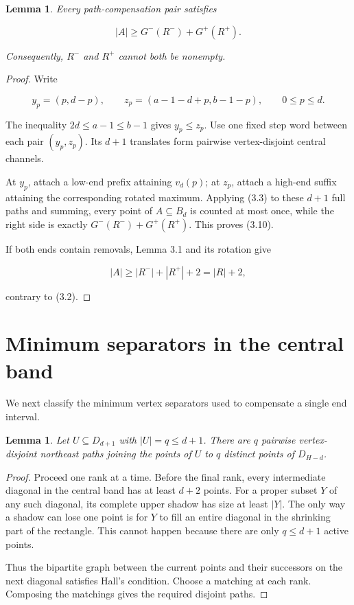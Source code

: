 \documentclass[11pt]{article}
\newtheorem{lemma}[theorem]{Lemma}
\numberwithin{equation}{section}
\begin{document}
\Needspace{0.25\textheight}
\begin{lemma}

Every path-compensation pair satisfies

\nopagebreak[4]
\[
|A|\ge G^-(R^-)+G^+(R^+).
\tag{3.10}
\]

Consequently, $R^-$ and $R^+$ cannot both be nonempty.

\end{lemma}

\begin{proof}

Write

\nopagebreak[4]
\[
y_p=(p,d-p),\qquad
z_p=(a-1-d+p,b-1-p),
\qquad 0\le p\le d.
\]

The inequality $2d\le a-1\le b-1$ gives $y_p\le z_p$. Use one fixed step
word between each pair $(y_p,z_p)$. Its $d+1$ translates form pairwise
vertex-disjoint central channels.

At $y_p$, attach a low-end prefix attaining $v_d(p)$; at $z_p$, attach a
high-end suffix attaining the corresponding rotated maximum. Applying
(3.3) to these $d+1$ full paths and summing, every point of $A\subseteq B_d$
is counted at most once, while the right side is exactly
$G^-(R^-)+G^+(R^+)$. This proves (3.10).

If both ends contain removals, Lemma 3.1 and its rotation give

\nopagebreak[4]
\[
|A|\ge |R^-|+|R^+|+2=|R|+2,
\]

contrary to (3.2).
\end{proof}


\section{Minimum separators in the central band}


We next classify the minimum vertex separators used to compensate a single
end interval.

\Needspace{0.25\textheight}
\begin{lemma}

Let $U\subseteq D_{d+1}$ with $|U|=q\le d+1$. There are $q$ pairwise
vertex-disjoint northeast paths joining the points of $U$ to $q$ distinct
points of $D_{H-d}$.

\end{lemma}

\begin{proof}

Proceed one rank at a time. Before the final rank, every intermediate
diagonal in the central band has at least $d+2$ points. For a proper subset
$Y$ of any such diagonal, its complete upper shadow has size at least
$|Y|$. The only way a shadow can lose one point is for $Y$ to fill an entire
diagonal in the shrinking part of the rectangle. This cannot happen because
there are only $q\le d+1$ active points.

Thus the bipartite graph between the current points and their successors on
the next diagonal satisfies Hall's condition. Choose a matching at each
rank. Composing the matchings gives the required disjoint paths.
\end{proof}
\end{document}
